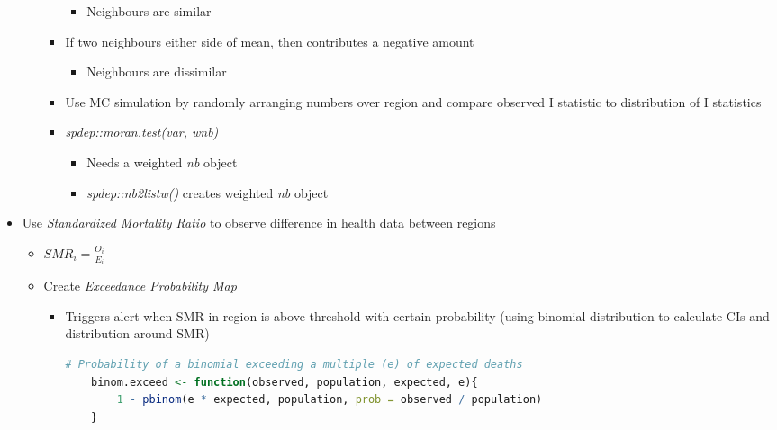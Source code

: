 \documentclass{article}
\begin{document}
\begin{itemize}
\begin{itemize}
\begin{itemize}
            \begin{itemize}
                \item Neighbours are similar
            \end{itemize}
            \item If two neighbours either side of mean, then contributes a negative amount
            \begin{itemize}
                \item Neighbours are dissimilar
            \end{itemize}
            \item Use MC simulation by randomly arranging numbers over region and compare observed I statistic to distribution of I statistics
            \item \textit{spdep::moran.test(var, wnb)}
            \begin{itemize}
                \item Needs a weighted \textit{nb} object
                \item \textit{spdep::nb2listw()} creates weighted \textit{nb} object
            \end{itemize}
        \end{itemize}
    \end{itemize}
    \item Use \textit{Standardized Mortality Ratio} to observe difference in health data between regions
    \begin{itemize}
        \item $SMR_i = \frac{O_i}{E_i}$
        \item Create \textit{Exceedance Probability Map}
        \begin{itemize}
            \item Triggers alert when SMR in region is above threshold with certain probability (using binomial distribution to calculate CIs and distribution around SMR)

\begin{lstlisting}[language=R]
    # Probability of a binomial exceeding a multiple (e) of expected deaths
    binom.exceed <- function(observed, population, expected, e){
        1 - pbinom(e * expected, population, prob = observed / population)
    }
\end{lstlisting}


\end{itemize}
\end{itemize}
\end{itemize}
\end{document}
